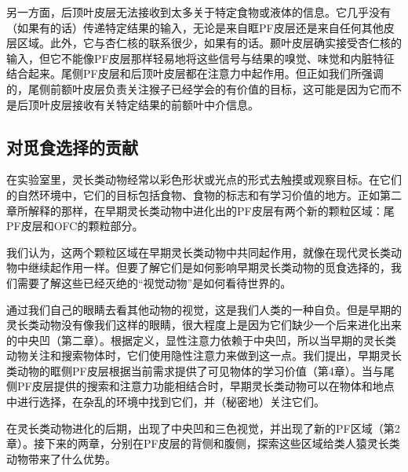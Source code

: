 另一方面，后顶叶皮层无法接收到太多关于特定食物或液体的信息。它几乎没有（如果有的话）传递特定结果的输入，无论是来自眶PF皮层还是来自任何其他皮层区域。此外，它与杏仁核的联系很少，如果有的话。颞叶皮层确实接受杏仁核的输入，但它不能像PF皮层那样轻易地将这些信号与结果的嗅觉、味觉和内脏特征结合起来。尾侧PF皮层和后顶叶皮层都在注意力中起作用。但正如我们所强调的，尾侧前额叶皮层负责关注猴子已经学会的有价值的目标，这可能是因为它而不是后顶叶皮层接收有关特定结果的前额叶中介信息。
\subsection{对觅食选择的贡献}
在实验室里，灵长类动物经常以彩色形状或光点的形式去触摸或观察目标。在它们的自然环境中，它们的目标包括食物、食物的标志和有学习价值的地方。正如第二章所解释的那样，在早期灵长类动物中进化出的PF皮层有两个新的颗粒区域：尾PF皮层和OFC的颗粒部分。

我们认为，这两个颗粒区域在早期灵长类动物中共同起作用，就像在现代灵长类动物中继续起作用一样。但要了解它们是如何影响早期灵长类动物的觅食选择的，我们需要了解这些已经灭绝的“视觉动物”是如何看待世界的。

通过我们自己的眼睛去看其他动物的视觉，这是我们人类的一种自负。但是早期的灵长类动物没有像我们这样的眼睛，很大程度上是因为它们缺少一个后来进化出来的中央凹（第二章）。根据定义，显性注意力依赖于中央凹，所以当早期的灵长类动物关注和搜索物体时，它们使用隐性注意力来做到这一点。我们提出，早期灵长类动物的眶侧PF皮层根据当前需求提供了可见物体的学习价值（第4章）。当与尾侧PF皮层提供的搜索和注意力功能相结合时，早期灵长类动物可以在物体和地点中进行选择，在杂乱的环境中找到它们，并（秘密地）关注它们。

在灵长类动物进化的后期，出现了中央凹和三色视觉，并出现了新的PF区域（第2章）。接下来的两章，分别在PF皮层的背侧和腹侧，探索这些区域给类人猿灵长类动物带来了什么优势。